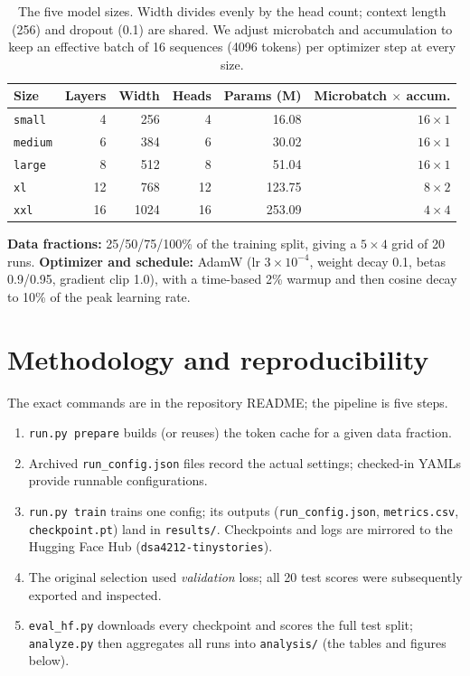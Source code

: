 \documentclass[12pt]{article}
\begin{document}
\begin{table}[htbp]
  \centering
  \caption{The five model sizes. Width divides evenly by the head count; context
  length (256) and dropout (0.1) are shared. We adjust microbatch and accumulation to
  keep an effective batch of 16 sequences (4096 tokens) per optimizer step at every
  size.}
  \label{tab:sizes}
  \begin{tabular}{lrrrrr}
    \toprule
    Size & Layers & Width & Heads & Params (M) & Microbatch $\times$ accum. \\
    \midrule
    \texttt{small}  &  4 &  256 &  4 &  16.08 & $16 \times 1$ \\
    \texttt{medium} &  6 &  384 &  6 &  30.02 & $16 \times 1$ \\
    \texttt{large}  &  8 &  512 &  8 &  51.04 & $16 \times 1$ \\
    \texttt{xl}     & 12 &  768 & 12 & 123.75 & $\phantom{0}8 \times 2$ \\
    \texttt{xxl}    & 16 & 1024 & 16 & 253.09 & $\phantom{0}4 \times 4$ \\
    \bottomrule
  \end{tabular}
\end{table}

\noindent\textbf{Data fractions:} 25/50/75/100\% of the training split, giving a
$5\times4$ grid of 20 runs. \textbf{Optimizer and schedule:} AdamW (lr
$3\times10^{-4}$, weight decay 0.1, betas 0.9/0.95, gradient clip 1.0), with a
time-based 2\% warmup and then cosine decay to 10\% of the peak learning rate.

\section{Methodology and reproducibility}
The exact commands are in the repository README; the pipeline is five steps.
\begin{enumerate}
  \item \texttt{run.py prepare} builds (or reuses) the token cache for a given data
        fraction.
  \item Archived \texttt{run\_config.json} files record the actual settings;
        checked-in YAMLs provide runnable configurations.
  \item \texttt{run.py train} trains one config; its outputs
        (\texttt{run\_config.json}, \texttt{metrics.csv}, \texttt{checkpoint.pt}) land
        in \texttt{results/}. Checkpoints and logs are mirrored to the Hugging Face
        Hub (\texttt{dsa4212-tinystories}).
  \item The original selection used \emph{validation} loss; all 20 test scores
        were subsequently exported and inspected.
  \item \texttt{eval\_hf.py} downloads every checkpoint and scores the full test
        split; \texttt{analyze.py} then aggregates all runs into \texttt{analysis/}
        (the tables and figures below).
\end{enumerate}
\end{document}
